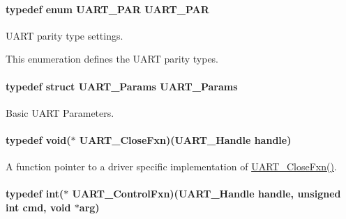 \paragraph[{U\-A\-R\-T\-\_\-\-P\-A\-R}]{\setlength{\rightskip}{0pt plus 5cm}typedef enum {\bf U\-A\-R\-T\-\_\-\-P\-A\-R}  {\bf U\-A\-R\-T\-\_\-\-P\-A\-R}}\label{_u_a_r_t_8h_a12584e934e85933c6b20b59b0ac5c343}


U\-A\-R\-T parity type settings. 

This enumeration defines the U\-A\-R\-T parity types. 
\paragraph[{U\-A\-R\-T\-\_\-\-Params}]{\setlength{\rightskip}{0pt plus 5cm}typedef struct {\bf U\-A\-R\-T\-\_\-\-Params}  {\bf U\-A\-R\-T\-\_\-\-Params}}\label{_u_a_r_t_8h_a533d172a10c22e1e5b94e9d0a055d882}


Basic U\-A\-R\-T Parameters. 

\paragraph[{U\-A\-R\-T\-\_\-\-Close\-Fxn}]{\setlength{\rightskip}{0pt plus 5cm}typedef void($\ast$ U\-A\-R\-T\-\_\-\-Close\-Fxn)({\bf U\-A\-R\-T\-\_\-\-Handle} handle)}\label{_u_a_r_t_8h_a220a3f8443b9112ee98253078f92eb27}


A function pointer to a driver specific implementation of \hyperlink{_u_a_r_t_8h_a220a3f8443b9112ee98253078f92eb27}{U\-A\-R\-T\-\_\-\-Close\-Fxn()}. 

\paragraph[{U\-A\-R\-T\-\_\-\-Control\-Fxn}]{\setlength{\rightskip}{0pt plus 5cm}typedef int($\ast$ U\-A\-R\-T\-\_\-\-Control\-Fxn)({\bf U\-A\-R\-T\-\_\-\-Handle} handle, unsigned int cmd, void $\ast$arg)}\label{_u_a_r_t_8h_ae4032cc8e010c6e11793d646de541c24}


